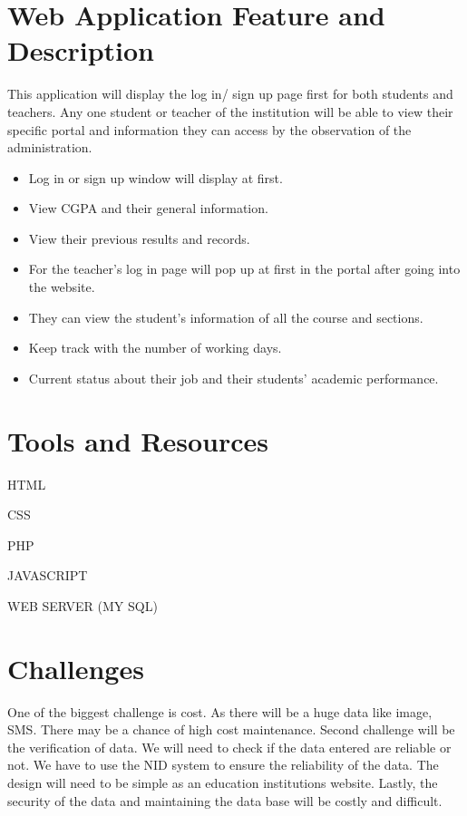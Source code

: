 \documentclass[a4paper,12pt]{article}
\begin{document}
\section{Web Application Feature and Description}
This application will display the log in/ sign up page first for both students and teachers. Any one student or teacher of the institution will be able to view their specific portal and information they can access by the observation of the administration.
\begin{itemize}
    \item Log in or sign up window will display at first.

\item View CGPA and their general information.

\item View their previous results and records.

\item For the teacher’s log in page will pop up at first in the portal after going into the website.

\item They can view the student’s information of all the course and sections.

\item Keep track with the number of working days.

\item Current status about their job and their students’ academic performance.
\end{itemize}

\section{Tools and Resources}

\hspace{0.6cm}HTML

CSS

PHP

JAVASCRIPT

WEB SERVER (MY SQL)


\section{Challenges}
One of the biggest challenge is cost. As there will be a huge data like image, SMS. There may be a chance of high cost maintenance. Second challenge will be the verification of data. We will need to check if the data entered are reliable or not. We have to use the NID system to ensure the reliability of the data. The design will need to be simple as an education institutions website. Lastly, the security of the data and maintaining the data base will be costly and difficult.
\end{document}
